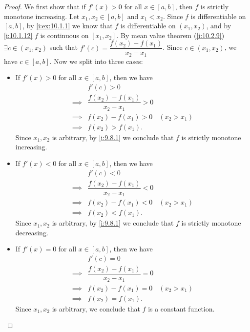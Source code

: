 \begin{proof}
  We first show that if \(f'(x) > 0\) for all \(x \in [a, b]\), then \(f\) is strictly monotone increasing.
  Let \(x_1, x_2 \in [a, b]\) and \(x_1 < x_2\).
  Since \(f\) is differentiable on \([a, b]\), by \cref{i:ex:10.1.1} we know that \(f\) is differentiable on \((x_1, x_2)\), and by \cref{i:10.1.12} \(f\) is continuous on \([x_1, x_2]\).
  By mean value theorem (\cref{i:10.2.9}) \(\exists c \in (x_1, x_2)\) such that \(f'(c) = \dfrac{f(x_2) - f(x_1)}{x_2 - x_1}\).
  Since \(c \in (x_1, x_2)\), we have \(c \in [a, b]\).
  Now we split into three cases:
  \begin{itemize}
    \item If \(f'(x) > 0\) for all \(x \in [a, b]\), then we have
          \begin{align*}
                     & f'(c) > 0                                            \\
            \implies & \dfrac{f(x_2) - f(x_1)}{x_2 - x_1} > 0               \\
            \implies & f(x_2) - f(x_1) > 0                    & (x_2 > x_1) \\
            \implies & f(x_2) > f(x_1).
          \end{align*}
          Since \(x_1, x_2\) is arbitrary, by \cref{i:9.8.1} we conclude that \(f\) is strictly monotone increasing.
    \item If \(f'(x) < 0\) for all \(x \in [a, b]\), then we have
          \begin{align*}
                     & f'(c) < 0                                            \\
            \implies & \dfrac{f(x_2) - f(x_1)}{x_2 - x_1} < 0               \\
            \implies & f(x_2) - f(x_1) < 0                    & (x_2 > x_1) \\
            \implies & f(x_2) < f(x_1).
          \end{align*}
          Since \(x_1, x_2\) is arbitrary, by \cref{i:9.8.1} we conclude that \(f\) is strictly monotone decreasing.
    \item If \(f'(x) = 0\) for all \(x \in [a, b]\), then we have
          \begin{align*}
                     & f'(c) = 0                                            \\
            \implies & \dfrac{f(x_2) - f(x_1)}{x_2 - x_1} = 0               \\
            \implies & f(x_2) - f(x_1) = 0                    & (x_2 > x_1) \\
            \implies & f(x_2) = f(x_1).
          \end{align*}
          Since \(x_1, x_2\) is arbitrary, we conclude that \(f\) is a constant function.
  \end{itemize}
\end{proof}

